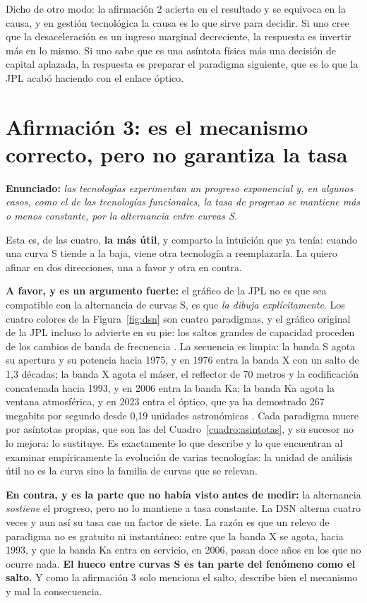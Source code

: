 \documentclass[11pt,letterpaper]{article}
\begin{document}
Dicho de otro modo: la afirmación 2 acierta en el resultado y se equivoca en la
causa, y en gestión tecnológica la causa es lo que sirve para decidir. Si uno
cree que la desaceleración es un ingreso marginal decreciente, la respuesta es
invertir más en lo mismo. Si uno sabe que es una asíntota física más una
decisión de capital aplazada, la respuesta es preparar el paradigma siguiente,
que es lo que la JPL acabó haciendo con el enlace óptico.

\section{Afirmación 3: es el mecanismo correcto, pero no garantiza la tasa}
\label{sec:af3}

\textbf{Enunciado:} \emph{las tecnologías experimentan un progreso exponencial
y, en algunos casos, como el de las tecnologías funcionales, la tasa de
progreso se mantiene más o menos constante, por la alternancia entre curvas
S.}

Esta es, de las cuatro, \textbf{la más útil}, y comparto la intuición que ya
tenía: cuando una curva S tiende a la baja, viene otra tecnología a
reemplazarla. La quiero afinar en dos direcciones, una a favor y otra en
contra.

\textbf{A favor, y es un argumento fuerte:} el gráfico de la JPL no es que sea
compatible con la alternancia de curvas S, es que \emph{la dibuja
explícitamente}. Los cuatro colores de la Figura~\ref{fig:dsn} son cuatro
paradigmas, y el gráfico original de la JPL incluso lo advierte en su pie: los
saltos grandes de capacidad proceden de los cambios de banda de frecuencia
\parencite{descanso2015}. La secuencia es limpia: la banda S agota su apertura
y su potencia hacia 1975, y en 1976 entra la banda X con un salto de 1,3
décadas; la banda X agota el máser, el reflector de 70 metros y la
codificación concatenada hacia 1993, y en 2006 entra la banda Ka; la banda Ka
agota la ventana atmosférica, y en 2023 entra el óptico, que ya ha demostrado
267 megabits por segundo desde 0,19 unidades astronómicas
\parencite{dsoc2023}. Cada paradigma muere por asíntotas propias, que son las
del Cuadro~\ref{cuadro:asintotas}, y su sucesor no lo mejora: lo sustituye. Es exactamente lo que describe
\textcite{foster1986} y lo que \textcite{sood2005} encuentran al examinar
empíricamente la evolución de varias tecnologías: la unidad de análisis útil
no es la curva sino la familia de curvas que se relevan.

\textbf{En contra, y es la parte que no había visto antes de medir:} la
alternancia \emph{sostiene} el progreso, pero no lo mantiene a tasa constante.
La DSN alterna cuatro veces y aun así su tasa cae un factor de siete. La razón
es que un relevo de paradigma no es gratuito ni instantáneo: entre que la
banda X se agota, hacia 1993, y que la banda Ka entra en servicio, en 2006,
pasan doce años en los que no ocurre nada. \textbf{El hueco entre curvas S es
tan parte del fenómeno como el salto.} Y como la afirmación 3 solo menciona el
salto, describe bien el mecanismo y mal la consecuencia.
\end{document}

